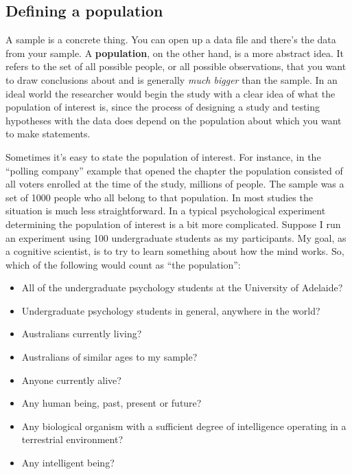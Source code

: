 \documentclass[
  a4paper,
]{book}
\providecommand{\tightlist}{%
  \setlength{\itemsep}{0pt}\setlength{\parskip}{0pt}}\usepackage{longtable,booktabs,array}
\begin{document}
\hypertarget{defining-a-population}{%
\subsection{Defining a population}\label{defining-a-population}}

A sample is a concrete thing. You can open up a data file and there's
the data from your sample. A \textbf{population}, on the other hand, is
a more abstract idea. It refers to the set of all possible people, or
all possible observations, that you want to draw conclusions about and
is generally \emph{much bigger} than the sample. In an ideal world the
researcher would begin the study with a clear idea of what the
population of interest is, since the process of designing a study and
testing hypotheses with the data does depend on the population about
which you want to make statements.

Sometimes it's easy to state the population of interest. For instance,
in the ``polling company'' example that opened the chapter the
population consisted of all voters enrolled at the time of the study,
millions of people. The sample was a set of 1000 people who all belong
to that population. In most studies the situation is much less
straightforward. In a typical psychological experiment determining the
population of interest is a bit more complicated. Suppose I run an
experiment using 100 undergraduate students as my participants. My goal,
as a cognitive scientist, is to try to learn something about how the
mind works. So, which of the following would count as ``the
population'':

\begin{itemize}
\tightlist
\item
  All of the undergraduate psychology students at the University of
  Adelaide?
\item
  Undergraduate psychology students in general, anywhere in the world?
\item
  Australians currently living?
\item
  Australians of similar ages to my sample?
\item
  Anyone currently alive?
\item
  Any human being, past, present or future?
\item
  Any biological organism with a sufficient degree of intelligence
  operating in a terrestrial environment?
\item
  Any intelligent being?
\end{itemize}
\end{document}
